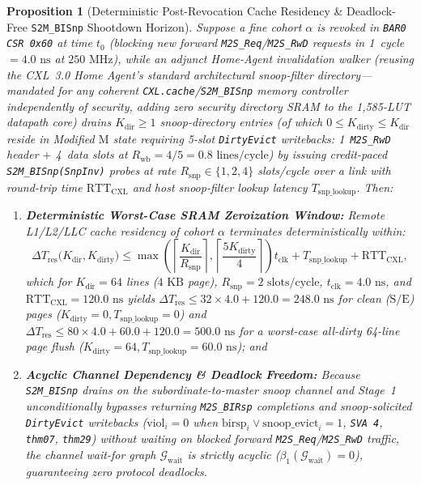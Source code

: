 \documentclass[10pt,twocolumn]{article}
\providecommand{\CoreClbLuts}{1,585}
\providecommand{\CorePhysicalLUTs}{\CoreClbLuts}
\theoremstyle{spectralthm}
\newtheorem{proposition}[theorem]{Proposition}
\begin{document}
\begin{proposition}[Deterministic Post-Revocation Cache Residency \& Deadlock-Free \texttt{S2M\_BISnp} Shootdown Horizon]
\label{prop:bisnp_shootdown}
Suppose a fine cohort $\alpha$ is revoked in \texttt{BAR0 CSR 0x60} at time $t_0$ (blocking new forward \texttt{M2S\_Req}/\texttt{M2S\_RwD} requests in 1~cycle $= 4.0\text{~ns}$ at $250\text{~MHz}$), while an adjunct Home-Agent invalidation walker (reusing the CXL~3.0 Home Agent's standard architectural snoop-filter directory---mandated for any coherent \texttt{CXL.cache}/\texttt{S2M\_BISnp} memory controller independently of security, adding zero security directory SRAM to the \CorePhysicalLUTs-LUT datapath core) drains $K_{\mathrm{dir}} \ge 1$ snoop-directory entries (of which $0 \le K_{\mathrm{dirty}} \le K_{\mathrm{dir}}$ reside in Modified $\mathrm{M}$ state requiring 5-slot \texttt{DirtyEvict} writebacks: 1~\texttt{M2S\_RwD} header $+$ 4~data slots at $R_{\mathrm{wb}} = 4/5 = 0.8\text{~lines/cycle}$) by issuing credit-paced \texttt{S2M\_BISnp(SnpInv)} probes at rate $R_{\mathrm{snp}} \in \{1,2,4\}$ slots/cycle over a link with round-trip time $\mathrm{RTT}_{\mathrm{CXL}}$ and host snoop-filter lookup latency $T_{\mathrm{snp\_lookup}}$. Then:
\begin{enumerate}
  \item[(i)] \textbf{Deterministic Worst-Case SRAM Zeroization Window:} Remote L1/L2/LLC cache residency of cohort $\alpha$ terminates deterministically within:
  \begin{equation}
  \label{eq:bisnp_horizon}
  \Delta T_{\mathrm{res}}\bigl(K_{\mathrm{dir}}, K_{\mathrm{dirty}}\bigr) \le \max\left(\left\lceil \frac{K_{\mathrm{dir}}}{R_{\mathrm{snp}}} \right\rceil, \left\lceil \frac{5 K_{\mathrm{dirty}}}{4} \right\rceil\right) t_{\mathrm{clk}}
  + T_{\mathrm{snp\_lookup}} + \mathrm{RTT}_{\mathrm{CXL}},
  \end{equation}
  which for $K_{\mathrm{dir}} = 64$ lines ($4\text{~KB}$ page), $R_{\mathrm{snp}} = 2\text{~slots/cycle}$, $t_{\mathrm{clk}} = 4.0\text{~ns}$, and $\mathrm{RTT}_{\mathrm{CXL}} = 120.0\text{~ns}$ yields $\Delta T_{\mathrm{res}} \le 32 \times 4.0 + 120.0 = 248.0\text{~ns}$ for clean ($\mathrm{S}/\mathrm{E}$) pages ($K_{\mathrm{dirty}} = 0, T_{\mathrm{snp\_lookup}} = 0$) and $\Delta T_{\mathrm{res}} \le 80 \times 4.0 + 60.0 + 120.0 = 500.0\text{~ns}$ for a worst-case all-dirty 64-line page flush ($K_{\mathrm{dirty}} = 64, T_{\mathrm{snp\_lookup}} = 60.0\text{~ns}$); and
  \item[(ii)] \textbf{Acyclic Channel Dependency \& Deadlock Freedom:} Because \texttt{S2M\_BISnp} drains on the subordinate-to-master snoop channel and Stage~1 unconditionally bypasses returning \texttt{M2S\_BIRsp} completions and snoop-solicited \texttt{DirtyEvict} writebacks ($\mathrm{viol}_i = 0$ when $\mathrm{birsp}_i \vee \mathrm{snoop\_evict}_i = 1$, \texttt{SVA 4}, \texttt{thm07}, \texttt{thm29}) without waiting on blocked forward \texttt{M2S\_Req}/\texttt{M2S\_RwD} traffic, the channel wait-for graph $\mathcal{G}_{\mathrm{wait}}$ is strictly acyclic ($\beta_1(\mathcal{G}_{\mathrm{wait}}) = 0$), guaranteeing zero protocol deadlocks.
\end{enumerate}
\end{proposition}
\end{document}
